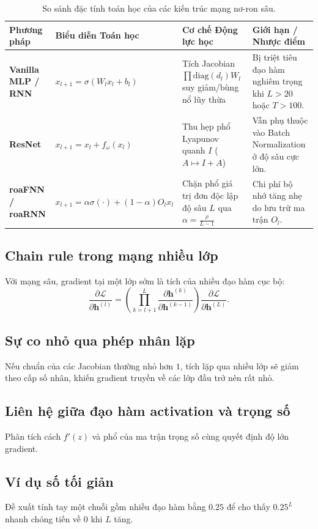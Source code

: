 \documentclass[12pt]{article}
\begin{document}
\begin{table}[h]
\centering
\small
\begin{tabular}{p{3.5cm}p{3.5cm}p{4cm}p{4cm}}
\toprule
\textbf{Phương pháp} & \textbf{Biểu diễn Toán học} & \textbf{Cơ chế Động lực học} & \textbf{Giới hạn / Nhược điểm} \\
\midrule
\textbf{Vanilla MLP / RNN} & $x_{l+1} = \sigma(W_l x_l + b_l)$ & Tích Jacobian $\prod \text{diag}(d_l)W_l$ suy giảm/bùng nổ lũy thừa & Bị triệt tiêu đạo hàm nghiêm trọng khi $L > 20$ hoặc $T > 100$. \\
\addlinespace
\textbf{ResNet} & $x_{l+1} = x_l + f_\omega(x_l)$ & Thu hẹp phổ Lyapunov quanh $I$ ($A \mapsto I + A$) & Vẫn phụ thuộc vào Batch Normalization ở độ sâu cực lớn. \\
\addlinespace
\textbf{roaFNN / roaRNN} & $x_{l+1} = \alpha \sigma(\cdot) + (1-\alpha)O_l x_l$ & Chặn phổ giá trị đơn độc lập độ sâu $L$ qua $\alpha = \frac{\rho}{L-1}$ & Chi phí bộ nhớ tăng nhẹ do lưu trữ ma trận $O_l$. \\
\bottomrule
\end{tabular}
\caption{So sánh đặc tính toán học của các kiến trúc mạng nơ-ron sâu.}
\end{table}


\subsection{Chain rule trong mạng nhiều lớp}
Với mạng sâu, gradient tại một lớp sớm là tích của nhiều đạo hàm cục bộ:
\[
\frac{\partial \mathcal{L}}{\partial \mathbf{h}^{(l)}}
=
\left(\prod_{k=l+1}^{L}
\frac{\partial \mathbf{h}^{(k)}}{\partial \mathbf{h}^{(k-1)}}\right)
\frac{\partial \mathcal{L}}{\partial \mathbf{h}^{(L)}}.
\]

\subsection{Sự co nhỏ qua phép nhân lặp}
Nếu chuẩn của các Jacobian thường nhỏ hơn $1$, tích lặp qua nhiều lớp sẽ giảm theo cấp số nhân, khiến gradient truyền về các lớp đầu trở nên rất nhỏ.

\subsection{Liên hệ giữa đạo hàm activation và trọng số}
Phân tích cách $f'(z)$ và phổ của ma trận trọng số cùng quyết định độ lớn gradient.

\subsection{Ví dụ số tối giản}
Đề xuất tính tay một chuỗi gồm nhiều đạo hàm bằng $0.25$ để cho thấy $0.25^L$ nhanh chóng tiến về $0$ khi $L$ tăng.
\end{document}
